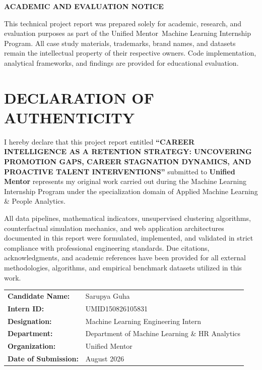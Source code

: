 \documentclass[12pt,a4paper,oneside]{report}
\newcommand{\ReportTitle}{CAREER INTELLIGENCE AS A RETENTION STRATEGY: UNCOVERING PROMOTION GAPS, CAREER STAGNATION DYNAMICS, AND PROACTIVE TALENT INTERVENTIONS}
\newcommand{\BranchName}{Applied Machine Learning \& People Analytics}
\newcommand{\UniversityName}{Unified Mentor}
\newcommand{\DepartmentName}{Department of Machine Learning \& HR Analytics}
\newcommand{\SubmissionDate}{August 2026}
\newcommand{\AuthorName}{Sarupya Guha}
\newcommand{\InternID}{UMID150826105831}
\begin{document}
\begin{titlepage}
\vfill

\begin{tcolorbox}[colback=white,colframe=black,arc=0mm,boxrule=1pt,width=\textwidth]
\fontsize{9.5}{12.5}\selectfont
\textbf{ACADEMIC AND EVALUATION NOTICE}\par
This technical project report was prepared solely for academic, research, and evaluation purposes as part of the \UniversityName\ Machine Learning Internship Program. All case study materials, trademarks, brand names, and datasets remain the intellectual property of their respective owners. Code implementation, analytical frameworks, and findings are provided for educational evaluation.
\end{tcolorbox}

\vspace{0.15in}
\end{titlepage}

\clearpage
{}
\setcounter{page}{1}

\chapter*{DECLARATION OF AUTHENTICITY}

I hereby declare that this project report entitled \textbf{``\ReportTitle''} submitted to \textbf{\UniversityName} represents my original work carried out during the Machine Learning Internship Program under the specialization domain of \BranchName.

All data pipelines, mathematical indicators, unsupervised clustering algorithms, counterfactual simulation mechanics, and web application architectures documented in this report were formulated, implemented, and validated in strict compliance with professional engineering standards. Due citations, acknowledgments, and academic references have been provided for all external methodologies, algorithms, and empirical benchmark datasets utilized in this work.

\vspace{0.4in}
\begin{tabular}{ll}
\textbf{Candidate Name:} & \AuthorName \\
\textbf{Intern ID:} & \InternID \\
\textbf{Designation:} & Machine Learning Engineering Intern \\
\textbf{Department:} & \DepartmentName \\
\textbf{Organization:} & \UniversityName \\
\textbf{Date of Submission:} & \SubmissionDate \\
\end{tabular}
\end{document}
